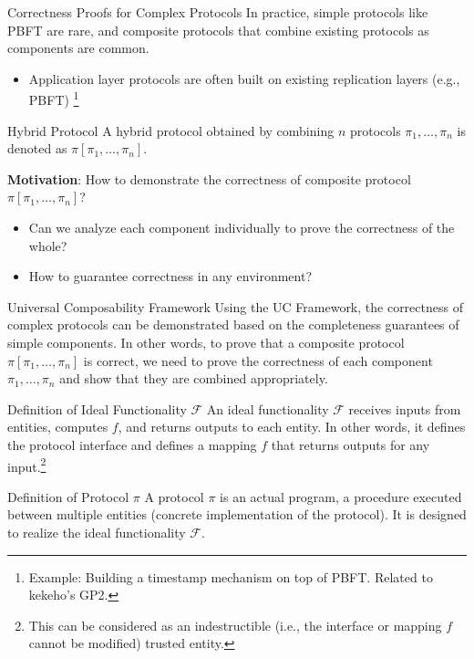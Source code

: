 \documentclass[aspectratio=169,10pt]{beamer}
\newenvironment{proofblock}[1][]
{\begin{block}{#1}\vspace{0.5em}}
{\vspace{0.5em}\end{block}}
\begin{document}
\begin{frame}{Correctness Proofs for Complex Protocols}
  In practice, simple protocols like PBFT are rare, and composite protocols that combine existing protocols as components are common.

  \begin{itemize}
    \item Application layer protocols are often built on existing replication layers (e.g., PBFT)
          \footnote{Example: Building a timestamp mechanism on top of PBFT. Related to kekeho's GP2.}
  \end{itemize}

  \begin{proofblock}[Hybrid Protocol]
    A hybrid protocol obtained by combining $n$ protocols $\pi_1,\dots,\pi_n$ is denoted as $\pi[\pi_1,\dots,\pi_n]$.
    
  \end{proofblock}

  \textbf{Motivation}: How to demonstrate the correctness of composite protocol $\pi[\pi_1,\dots,\pi_n]$?
  \begin{itemize}
    \item Can we analyze each component individually to prove the correctness of the whole?
    \item How to guarantee correctness in any environment?
  \end{itemize}
\end{frame}

\begin{frame}{Universal Composability Framework}
Using the UC Framework, the correctness of complex protocols can be demonstrated based on the completeness guarantees of simple components.
In other words, to prove that a composite protocol $\pi[\pi_1,\dots,\pi_n]$ is correct, we need to prove the correctness of each component $\pi_1,\dots,\pi_n$ and show that they are combined appropriately.

  \begin{proofblock}[Definition of Ideal Functionality $\mathcal{F}$]
    An ideal functionality $\mathcal{F}$ receives inputs from entities, computes $f$, and returns outputs to each entity.
    In other words, it defines the protocol interface and defines a mapping $f$ that returns outputs for any input.\footnote{This can be considered as an indestructible (i.e., the interface or mapping $f$ cannot be modified) trusted entity.}
  \end{proofblock}

  \begin{proofblock}[Definition of Protocol $\pi$]
    A protocol $\pi$ is an actual program, a procedure executed between multiple entities (concrete implementation of the protocol).
    It is designed to realize the ideal functionality $\mathcal{F}$.
  \end{proofblock}
\end{frame}
\end{document}

